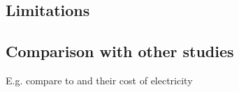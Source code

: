 \lipsum[1]

\subsection{Limitations}
\subsection{Comparison with other studies}
E.g. compare to \cite{Hampp2021} and their cost of electricity